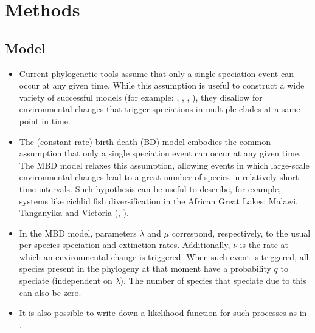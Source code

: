 \documentclass{article}
\begin{document}
\section{Methods}

\subsection{Model}
\begin{itemize}

\item Current phylogenetic tools assume that only a single speciation event can occur at any given time.
While this assumption is useful to construct a wide variety of successful 
models (for example: \cite{Maddison2007biSSE}, \cite{Valente2015}, \cite{etienne2012diversity}, \cite{etienne2014estimating}),
they disallow for environmental changes that trigger speciations in multiple clades at a same point in time.

\item The (constant-rate) birth-death (BD) model embodies the common assumption that 
only a single speciation event can occur at any given time.
The MBD model relaxes this assumption, allowing events in which 
large-scale environmental changes lead to a great number of species 
in relatively short time intervals. Such hypothesis can be useful to describe, for example, 
systems like cichlid fish diversification in the 
African Great Lakes: Malawi, Tanganyika and Victoria (\cite{janzen2016}, \cite{janzen2017}).

\item In the MBD model, parameters $\lambda$ and $\mu$ correspond, respectively, 
to the usual per-species speciation and extinction rates. 
Additionally, $\nu$ is the rate at which an environmental change is triggered.
When such event is triggered, all species present in the phylogeny at that moment
have a probability $q$ to speciate (independent on $\lambda$).
The number of species that speciate due to this can also be zero. 

\item It is also possible to write down a likelihood function for such processes as in \cite{mbd}.
    
\end{itemize}
\end{document}
